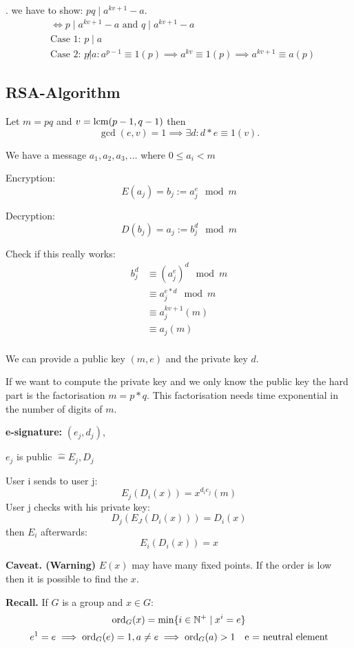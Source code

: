 \Proof.
we have to show: $pq \mid a ^{kv +1} - a$. 
\begin{align*}
  &\Leftrightarrow p \mid a ^{kv +1} - a \text{ and } q \mid a ^{kv +1} - a\\
  &\text{Case 1: } p \mid a \\
  &\text{Case 2: } p\not| a: 
    a^{p-1} \equiv 1 (p) \implies a^{kv} \equiv 1(p) \implies a^{kv+1} \equiv a(p)
\end{align*}

\subsection{RSA-Algorithm}
Let $m = pq$ and $v = \operatorname{lcm}(p-1, q-1)$ then 
\[
  \gcd(e,v) = 1 \implies \exists d : d *e \equiv 1 (v).
\]

We have a message $a_1, a_2, a_3, \ldots$ where $0 \leq a_i < m$

Encryption: 
\[
  E(a_j) = b_j := a_j^e \mod m
\]

Decryption: 
\[
  D(b_j) = a_j := b_j^d \mod m
\]

Check if this really works:
\begin{align*}
  b_j^d &\equiv (a_j^e)^d \mod m \\
    & \equiv a_j^{e*d} \mod m \\
    & \equiv a_j^{kv+1} (m) \\
    & \equiv a_j (m) \\
\end{align*}

We can provide a public key $(m,e)$ and the private key $d$.

If we want to compute the private key and we only know the public key the hard part is the factorisation $m = p*q$. This factorisation needs time exponential in the number of digits of $m$.

\textbf{e-signature: } 
$(e_j,d_j)$,

$e_j$ is public $\hat{=} E_j, D_j$

User i sends to user j:
\[
  E_j(D_i(x)) = x^{d_i e_j} (m)
\]
User j checks with his private key:
\[
  D_j (E_J(D_i(x))) = D_i(x)
\]
then $E_i$ afterwards:
\[
  E_i(D_i(x)) = x
\]

\textbf{Caveat. (Warning)}
$E(x)$ may have many fixed points. 
If the order is low then it is possible to find the $x$. 

\textbf{Recall.}
If $G$ is a group and $x\in G$:
\[
  \operatorname{ord}_G(x) = \min\{ i\in \mathbb{N}^{+} \mid x^i = e \}
\]
\[
  e^1 = e \implies \operatorname{ord}_G(e) = 1, a \neq e \implies \operatorname{ord}_G(a) > 1 \quad \text{e = neutral element}
\]

